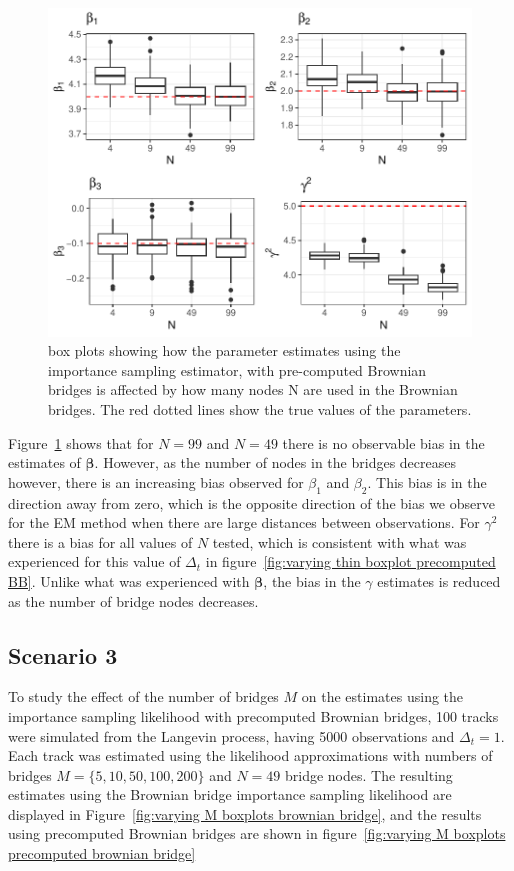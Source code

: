 \begin{figure}[H]
    \centering
    \includegraphics[width=\linewidth]{Images/Results/varying N estimates precomputed BB.pdf}
    \caption[Box plots of Parameter Estimates using pre-computed Brownian bridge importance sampling using different numbers of bridge nodes]{box plots showing how the parameter estimates using the importance sampling estimator, with pre-computed Brownian bridges is affected by how many nodes N are used in the Brownian bridges. The red dotted lines show the true values of the parameters.}
    \label{fig: varying N boxplots precomputed brownian bridge}
\end{figure}

Figure~\ref{fig: varying N boxplots precomputed brownian bridge} shows that for $N=99$ and $N=49$ there is no observable bias in the estimates of $\bm \beta$. However, as the number of nodes in the bridges decreases however, there is an increasing bias observed for $\beta_1$ and $\beta_2$. This bias is in the direction away from zero, which is the opposite direction of the bias we observe for the EM method when there are large distances between observations. For $\gamma^2$ there is a bias for all values of $N$ tested, which is consistent with what was experienced for this value of $\Delta_t$ in figure~\ref{fig:varying thin boxplot precomputed BB}. Unlike what was experienced with $\bm \beta$, the bias in the $\gamma$ estimates is reduced as the number of bridge nodes decreases.

\subsection{Scenario 3}
To study the effect of the number of bridges $M$ on the estimates using the importance sampling likelihood with precomputed Brownian bridges, 100 tracks were simulated from the Langevin process, having 5000 observations and $\Delta_t = 1$. Each track was estimated using the likelihood approximations with numbers of bridges $M=\{5,10,50,100,200\}$ and $N=49$ bridge nodes. The resulting estimates using the Brownian bridge importance sampling likelihood are displayed in Figure~\ref{fig:varying M boxplots brownian bridge}, and the results using precomputed Brownian bridges are shown in figure~\ref{fig:varying M boxplots precomputed brownian bridge}


